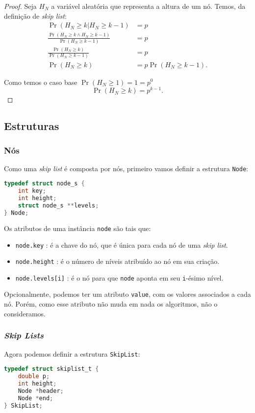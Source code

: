 \documentclass[paper=a4, fontsize=11pt]{scrartcl} %
\numberwithin{equation}{section}
\numberwithin{figure}{section}
\numberwithin{table}{section}
\numberwithin{definition}{section}
\numberwithin{theorem}{section}
\numberwithin{property}{section}
\numberwithin{proposition}{section}
\newcommand{\SLs}{\textit{Skip Lists}\xspace}
\newcommand{\skl}{\textit{skip list}\xspace}
\renewcommand{\sl}{\textit{skip list}\xspace}
\begin{document}
\begin{proof}
Seja $H_N$ a variável aleatória que representa a altura de um nó. Temos, da definição de \sl:
\begin{align*}
\Pr(H_N \geq k | H_N \geq k - 1) &= p \\
\frac{\Pr(H_N \geq k \land H_N \geq k - 1)}{\Pr(H_N \geq k - 1)} &= p  \\
\frac{\Pr(H_N \geq k)}{\Pr(H_N \geq k - 1)} &= p  \\
\Pr(H_N \geq k) &= p \Pr(H_N \geq k - 1).
\end{align*}

Como temos o caso base $\Pr(H_N \geq 1) = 1 = p^0$
$$
\Pr(H_N \geq k) = p^{k - 1}.
$$
\end{proof}

\subsection{Estruturas} \label{sec:estrut}



\subsubsection{Nós}

Como uma \skl é composta por nós, primeiro vamos definir a estrutura \verb|Node|:

\begin{lstlisting}[language=C]
typedef struct node_s {
    int key;
    int height;
    struct node_s **levels;
} Node;
\end{lstlisting}

Os atributos de uma instância \verb|node| são tais que:
\begin{itemize}[noitemsep]
  \item \verb|node.key| : é a chave do nó, que é única para cada nó de uma \skl.
  \item \verb|node.height| : é o número de níveis atribuído ao nó em sua criação.
  \item \verb|node.levels[i]| : é o nó para que \verb|node| aponta em seu \verb|i|-ésimo nível.
\end{itemize}

Opcionalmente, podemos ter um atributo \verb|value|, com os valores associados a cada nó. Porém, como esse
atributo não muda em nada os algoritmos, não o consideramos.

\subsubsection{\SLs}
Agora podemos definir a estrutura \verb|SkipList|:
\begin{lstlisting}[language=C]
typedef struct skiplist_t {
    double p;
    int height;
    Node *header;
    Node *end;
} SkipList;
\end{lstlisting}
\end{document}
